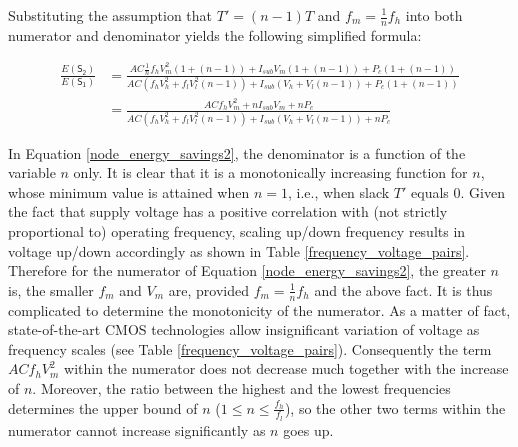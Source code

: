 \documentclass[12pt]{elsarticle}
\begin{document}
Substituting the assumption that $T' = (n-1) T$ and $f_m = \frac{1}{n}f_h$ into both numerator and denominator yields the following simplified formula:

\vspace{-4mm}
\begin{align}
\label{node_energy_savings2}
\frac{E(\mathsf{S_2})}{E(\mathsf{S_1})} &= \frac{AC\frac{1}{n}f_hV_m^2 \left(1 + \left(n-1\right)\right) + I_{sub}V_m \left(1 + \left(n-1\right)\right) + P_c \left(1 + \left(n-1\right)\right)}{AC \left(f_hV_h^2 + f_lV_l^2\left(n-1\right)\right) + I_{sub}\left(V_h + V_l\left(n-1\right)\right) + P_c \left(1 + \left(n-1\right)\right)}\nonumber\\
&= \frac{ACf_hV_m^2 + nI_{sub}V_m + nP_c}{AC \left(f_hV_h^2 + f_lV_l^2\left(n-1\right)\right) + I_{sub}\left(V_h + V_l\left(n-1\right)\right) + nP_c}
\end{align}


In Equation \ref{node_energy_savings2}, the denominator is a function of the variable $n$ only. It is clear that it is a monotonically increasing function for $n$, whose minimum value is attained when $n = 1$, i.e., when slack $T'$ equals $0$. Given the fact that supply voltage has a positive correlation with (not strictly proportional to) operating frequency, scaling up/down frequency results in voltage up/down accordingly as shown in Table \ref{frequency_voltage_pairs}. Therefore for the numerator of Equation \ref{node_energy_savings2}, the greater $n$ is, the smaller $f_m$ and $V_m$ are, provided $f_m = \frac{1}{n}f_h$ and the above fact. It is thus complicated to determine the monotonicity of the numerator. As a matter of fact, state-of-the-art CMOS technologies allow insignificant variation of voltage as frequency scales (see Table \ref{frequency_voltage_pairs}). Consequently the term $ACf_hV_m^2$ within the numerator does not decrease much together with the increase of $n$. Moreover, the ratio between the highest and the lowest frequencies determines the upper bound of $n$ ($1 \leq n \leq \frac{f_h}{f_l}$), so the other two terms within the numerator cannot increase significantly as $n$ goes up.
\end{document}

